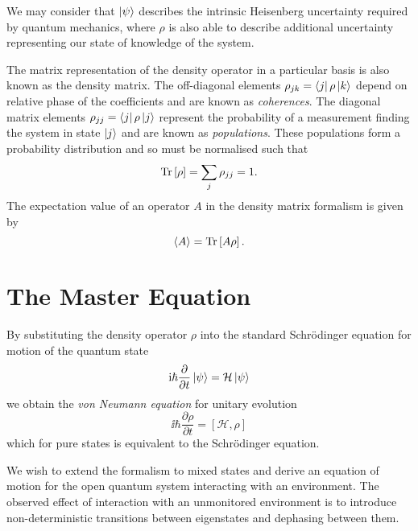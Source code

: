     We may consider that $\Ket{\psi}$ describes the intrinsic Heisenberg
    uncertainty required by quantum mechanics, where $\rho$ is also able to
    describe additional uncertainty representing our state of knowledge of the
    system.\cite{Steck2007}

    The matrix representation of the density operator in a particular basis is
    also known as the density matrix. The off-diagonal elements $\rho_{jk} =
    \Bra{j} \rho \Ket{k}$ depend on relative phase of the coefficients and are
    known as \textit{coherences}. The diagonal matrix elements $\rho_{jj} =
    \Bra{j} \rho \Ket{j}$ represent the probability of a measurement finding the
    system in state $\Ket{j}$ and are known as \textit{populations}. These
    populations form a probability distribution and so must be normalised such
    that
    \begin{equation}
      \operatorname{Tr}\left[{\rho}\right] = \sum_j{\rho_{jj}} = 1.
      \label{eqn:density_matrix_trace}
    \end{equation}
    The expectation value of an operator $A$ in the density matrix formalism is
    given by
    \begin{equation}\label{eqn:density_matrix_exp_value}
      \langle A \rangle = \operatorname{Tr} \left[{A \rho} \right].
    \end{equation}

  \section{The Master Equation}

    By substituting the density operator $\rho$ into the standard Schr\"{o}dinger equation for motion of the quantum state
    $$
      \mathrm{i} \hbar \frac{\partial}{\partial t} \ket{\psi} = \mathcal{H} \ket{\psi}
    $$
    we obtain the \textit{von Neumann equation} for unitary evolution
    \begin{equation}
      \ii \hbar \frac{\partial \rho}{\partial t} = [\mathcal{H}, \rho]
      \label{eqn:von_neu}
    \end{equation}
    which for pure states is equivalent to the Schr\"{o}dinger equation.

    We wish to extend the formalism to mixed states and derive an equation of
    motion for the open quantum system interacting with an environment. The
    observed effect of interaction with an unmonitored environment is to
    introduce non-deterministic transitions between eigenstates and dephasing
    between them.


